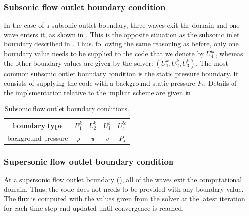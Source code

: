 \subsubsection{Subsonic flow outlet boundary condition} \label{sec:sub-flow-outlet-bc}
In the case of a subsonic outlet boundary, three waves exit the domain and one wave enters it, as shown in . This is the opposite situation as the subsonic inlet boundary described in . Thus. following the same reasoning as before, only one boundary value needs to be supplied to the code that we denote by $U_4^{bc}$, whereas the other boundary values are given by the solver: $\left(U_1^{k}, U_2^{k}, U_3^{k}\right)$. The most common subsonic outlet boundary condition is the static pressure boundary. It consists of supplying the code with a background static pressure $P_b$. Details of the implementation relative to the implicit scheme are given in . 
%
\begin{table}[!htbp]
\begin{center}
\caption{ Subsonic flow outlet boundary conditions.}
\label{tbl:sub-outlet-flow-bc}
\begin{tabular}{|c|c|c|c|c|}
 \hline
boundary type & $U_1^{k}$  & $U_2^{k}$ & $U_3^{k}$ & $U_4^{bc}$ \\  \hline
background pressure & $\rho$     & $u$    & $v$  & $P_b$     \\  \hline
\end{tabular}
\end{center}
\end{table}
\subsubsection{Supersonic flow outlet boundary condition} \label{sec:sup-flow-outlet-bc}
At a supersonic flow outlet boundary (), all of the waves exit the computational domain. Thus, the code does not needs to be provided with any boundary value. The flux is computed with the values given from the solver at the latest iteration for each time step and updated until convergence is reached. 

